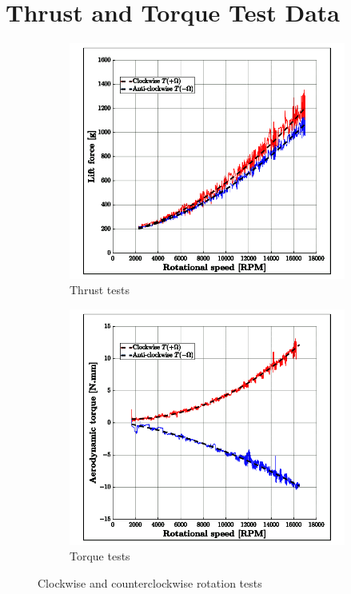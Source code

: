 \section{Thrust and Torque Test Data}
\label{app:thrust-torque}
\vspace{-20pt}
\begin{figure}[htbp]
\begin{subfigure}{0.5\textwidth}
\centering
\includegraphics[width=\textwidth]{graphs/thrust-rotation}
\caption{Thrust tests}
\label{app:thrust-test}
\end{subfigure}
\begin{subfigure}{0.5\textwidth}
\centering
\includegraphics[width=\textwidth]{graphs/torque-rotation}
\caption{Torque tests}
\label{app:torque-test}
\end{subfigure}
\caption{Clockwise and counterclockwise rotation tests}
\end{figure}
